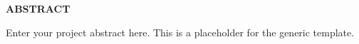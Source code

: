 \begin{center}
	\LARGE \textbf{ABSTRACT}
\end{center}

\vspace{1cm}

\noindent Enter your project abstract here. This is a placeholder for the generic template.
